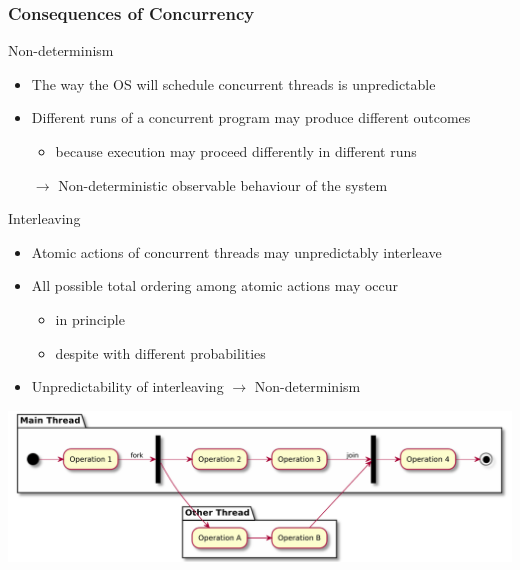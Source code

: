 \documentclass{beamer}\mode<presentation>{\usetheme{AMSBolognaFC}}
\begin{document}
\begin{frame}[allowframebreaks]
    \frametitle{Consequences of Concurrency}

    \begin{block}{Non-determinism}
        \begin{itemize}
            \item The way the OS will schedule concurrent threads is unpredictable
            \item Different runs of a concurrent program may produce different outcomes
            \begin{itemize}
                \item because execution may proceed differently in different runs
            \end{itemize}
            \item[$\rightarrow$] Non-deterministic observable behaviour of the system
        \end{itemize}
    \end{block}

    \begin{block}{Interleaving}
        \begin{itemize}
            \item \alert{Atomic} actions of concurrent threads may unpredictably \alert{interleave}
            \item All possible total ordering among atomic actions may occur
            \begin{itemize}
                \item in principle
                \item despite with different probabilities
            \end{itemize}
            \item Unpredictability of interleaving $\rightarrow$ Non-determinism
        \end{itemize}
    \end{block}

    \framebreak

    \begin{center}
        \includegraphics[width=\linewidth]{img/fork-join.pdf}
    \end{center}


\end{frame}
\end{document}
